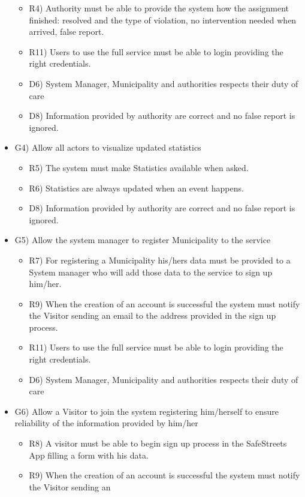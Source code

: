 \begin{itemize}
\begin{itemize}
 \item R4) Authority must be able to provide the system how the assignment finished: resolved and the
type of violation, no intervention needed when arrived, false report.
 \item R11) Users to use the full service must be able to login providing the right credentials.
 \item D6) System Manager, Municipality and authorities respects their duty of care
 \item D8) Information provided by authority are correct and no false report is ignored.
\end{itemize}
\item G4) Allow all actors to visualize updated statistics
\begin{itemize}
\item R5) The system must make Statistics available when asked.
\item R6) Statistics are always updated when an event happens.
 \item D8) Information provided by authority are correct and no false report is ignored.
\end{itemize}
\item G5) Allow the system manager to register Municipality to the service
\begin{itemize}
\item R7) For registering a Municipality his/hers data must be provided to a System manager who will add those data to the service to sign up him/her.
\item R9) When the creation of an account is successful the system must notify the Visitor sending an email to the address provided in the sign up process.
 \item R11) Users to use the full service must be able to login providing the right credentials.
\item D6) System Manager, Municipality and authorities respects their duty of care
\end{itemize}
\item G6) Allow a Visitor to join the system registering him/herself to ensure reliability of the information provided by him/her
\begin{itemize}
\item R8) A visitor must be able to begin sign up process in the SafeStreets App filling a form with his
data.
\item R9) When the creation of an account is successful the system must notify the Visitor sending an

\end{itemize}
\end{itemize}
